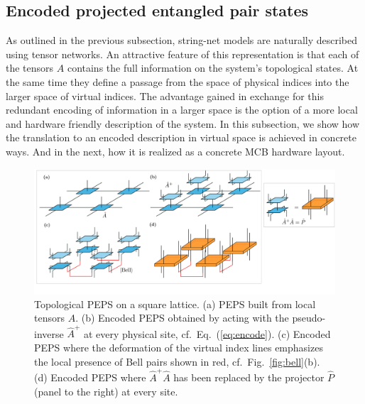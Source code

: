 \documentclass[twocolumn,floats,prx,showpacs]{revtex4-1}
\begin{document}
\subsection{Encoded projected entangled pair states}\label{sec4b}

As outlined in the previous subsection, string-net models are  naturally described using tensor networks. An attractive feature of this representation is that each of the tensors $A$ contains the full information on the system's topological states. At the same time they define a passage from the space of physical indices into the larger space of virtual indices. The advantage gained in exchange for this redundant encoding of information in a larger space is the option of a more local and hardware friendly description of the system. In this subsection, we show how the translation to an encoded description in virtual space is achieved in concrete ways. And in the next, how it is realized as a concrete MCB hardware layout. 


\begin{figure}[t]
\includegraphics[width=2\columnwidth]{fig/encode.pdf}
\caption{
Topological PEPS on a square lattice. (a) PEPS built from local tensors $A$. (b) Encoded PEPS obtained by acting with the pseudo-inverse $\hat A^+$ at every physical site, cf.~Eq.~(\ref{eq:encode}). (c) Encoded PEPS where the deformation of the virtual index lines emphasizes  the local presence of Bell pairs shown in red, cf.~Fig.~\ref{fig:bell}(b). 
(d) Encoded PEPS where $\hat A^+ \hat A$ has been replaced by the projector $\hat P$ (panel to the right) at every site. }
\label{fig:encode}
\end{figure}
\end{document}
